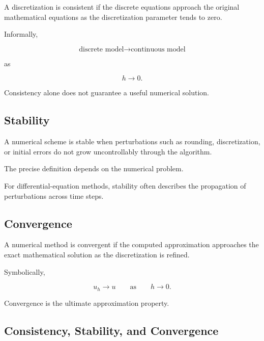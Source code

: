 A discretization is consistent if the discrete equations approach the
original mathematical equations as the discretization parameter tends to
zero.

Informally,

\[
\boxed{
\text{discrete model}
\to
\text{continuous model}
}
\]

as

\[
\boxed{
h\to0.
}
\]

Consistency alone does not guarantee a useful numerical solution.

\subsection{Stability}
\label{subsec:numerical-method-stability}

A numerical scheme is stable when perturbations such as rounding,
discretization, or initial errors do not grow uncontrollably through the
algorithm.

The precise definition depends on the numerical problem.

For differential-equation methods, stability often describes the
propagation of perturbations across time steps.

\subsection{Convergence}
\label{subsec:numerical-method-convergence}

A numerical method is convergent if the computed approximation approaches
the exact mathematical solution as the discretization is refined.

Symbolically,

\[
\boxed{
u_h
\to
u
\qquad
\text{as}
\qquad
h\to0.
}
\]

Convergence is the ultimate approximation property.

\subsection{Consistency, Stability, and Convergence}
\label{subsec:consistency-stability-convergence}

